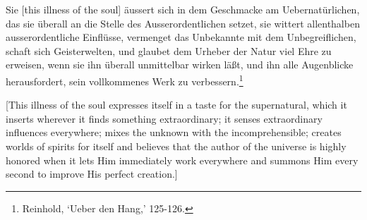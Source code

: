 Sie [this illness of the soul] \"{a}ussert sich in dem Geschmacke am Uebernat\"{u}rlichen, das sie \"{u}berall an die Stelle des Ausserordentlichen setzet, sie wittert allenthalben ausserordentliche Einfl\"{u}sse, vermenget das Unbekannte mit dem Unbegreiflichen, schaft sich Geisterwelten, und glaubet dem Urheber der Natur viel Ehre zu erweisen, wenn sie ihn \"{u}berall unmittelbar wirken l\"{a}\ss{}t, und ihn alle Augenblicke herausfordert, sein vollkommenes Werk zu verbessern.\footnote{ Reinhold, `Ueber den Hang,' 125{-}126.}

[This illness of the soul expresses itself in a taste for the supernatural, which it inserts wherever it finds something extraordinary; it senses extraordinary influences everywhere; mixes the unknown with the incomprehensible; creates worlds of spirits for itself and believes that the author of the universe is highly honored when it lets Him immediately work everywhere and summons Him every second to improve His perfect creation.] 

